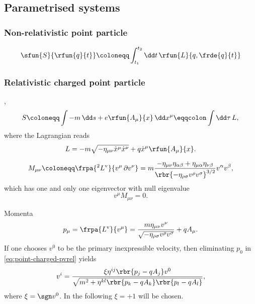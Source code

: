 \documentclass[a4paper,11pt]{article}
\begin{document}
\subsection{Parametrised systems}

\subsubsection*{Non-relativistic point particle}

\cite[sec.\ 3.1.1]{Kiefer2012}
\begin{equation}
\sfun{S}{\rfun{q}{t}} \coloneqq \int_{t_1}^{t_2}\dd t\,\rfun{L}{q, \frde{q}{t}}
\end{equation}



\subsubsection*{Relativistic charged point particle}

\cite[sec.\ 16]{Landau1975},
\cite[sec.\ 3.1.2]{Kiefer2012}
\begin{equation}
S \coloneqq \int -m\,\dd s + e \rfun{A_\mu}{x} \,\dd x^\mu \eqqcolon \int\dd 
\tau\, L,\\
\label{eq:point-charged-action}
\end{equation}
where the Lagrangian reads
\begin{equation}
L = -m \sqrt{-\eta_{\mu\nu} \dot{x}^\mu \dot{x}^\nu } + q \dot{x}^\mu 
\rfun{A_\mu}{x}.
\end{equation}

\begin{equation}
M_{\mu\nu} \coloneqq \frpa{^2 L^\text{v}}{v^\mu\,\partial v^\nu} = 
m\frac{-\eta_{\mu\nu}\eta_{\alpha\beta} + \eta_{\mu\alpha}\eta_{\nu\beta}}%
{\rbr{-\eta_{\rho\sigma}v^\rho v^\sigma}^{3/2}} v^\alpha v^\beta,
\end{equation}
which has one and only one eigenvector with null eigenvalue
\begin{equation}
v^\mu M_{\mu\nu} = 0.
\end{equation}

Momenta
\begin{equation}
p_\mu = \frpa{L^\text{v}}{v^\mu} = 
\frac{m\eta_{\mu\nu}v^\nu}{\sqrt{-\eta_{\rho\sigma}v^\rho v^\sigma}} + q A_\mu.
\label{eq:point-charged-pvrel}
\end{equation}
If one chooses $v^0$ to be the primary inexpressible velocity, then eliminating
$p_0$ in \cref{eq:point-charged-pvrel} yields
\begin{equation}
v^i = \frac{\xi \eta^{ij} \rbr{p_j - q A_j} v^0}{\sqrt{m^2 + \eta^{kl}
\rbr{p_k - q A_k}\rbr{p_l - q A_l}}},
\label{eq:point-charged-pvrel0}
\end{equation}
where $\xi = \sgn v^0$. In the following $\xi = +1$ will be chosen.
\end{document}
